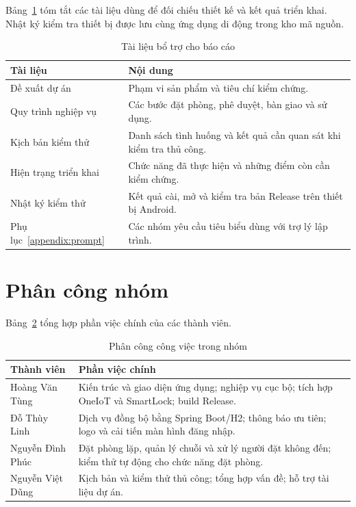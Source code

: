Bảng~\ref{tab:docs} tóm tắt các tài liệu dùng để đối chiếu thiết kế và kết quả triển khai. Nhật ký kiểm tra thiết bị được lưu cùng ứng dụng di động trong kho mã nguồn.

\begin{table}[H]
\centering
\caption{Tài liệu bổ trợ cho báo cáo}
\label{tab:docs}
\small
\begin{tabularx}{\textwidth}{>{\raggedright\arraybackslash}p{4.6cm} X}
\toprule
\rowcolor{RoomHubLight}
\textbf{Tài liệu} & \textbf{Nội dung} \\
\midrule
Đề xuất dự án & Phạm vi sản phẩm và tiêu chí kiểm chứng. \\
Quy trình nghiệp vụ & Các bước đặt phòng, phê duyệt, bàn giao và sử dụng. \\
Kịch bản kiểm thử & Danh sách tình huống và kết quả cần quan sát khi kiểm tra thủ công. \\
Hiện trạng triển khai & Chức năng đã thực hiện và những điểm còn cần kiểm chứng. \\
Nhật ký kiểm thử & Kết quả cài, mở và kiểm tra bản Release trên thiết bị Android. \\
Phụ lục~\ref{appendix:prompt} & Các nhóm yêu cầu tiêu biểu dùng với trợ lý lập trình. \\
\bottomrule
\end{tabularx}
\end{table}

\section{Phân công nhóm}

Bảng~\ref{tab:contrib} tổng hợp phần việc chính của các thành viên.

\begin{table}[H]
\centering
\caption{Phân công công việc trong nhóm}
\label{tab:contrib}
\small
\begin{tabularx}{\textwidth}{>{\raggedright\arraybackslash}p{3.8cm} X}
\toprule
\rowcolor{RoomHubLight}
\textbf{Thành viên} & \textbf{Phần việc chính} \\
\midrule
Hoàng Văn Tùng & Kiến trúc và giao diện ứng dụng; nghiệp vụ cục bộ; tích hợp OneIoT và SmartLock; build Release. \\
Đỗ Thùy Linh & Dịch vụ đồng bộ bằng Spring Boot/H2; thông báo ưu tiên; logo và cải tiến màn hình đăng nhập. \\
Nguyễn Đình Phúc & Đặt phòng lặp, quản lý chuỗi và xử lý người đặt không đến; kiểm thử tự động cho chức năng đặt phòng. \\
Nguyễn Việt Dũng & Kịch bản và kiểm thử thủ công; tổng hợp vấn đề; hỗ trợ tài liệu dự án. \\
\bottomrule
\end{tabularx}
\end{table}

